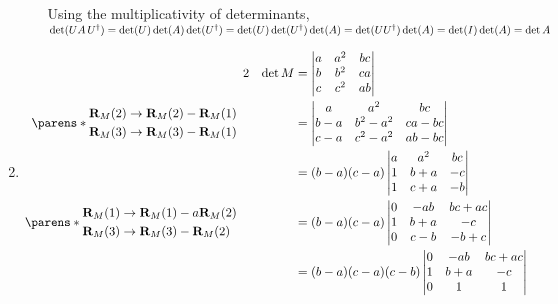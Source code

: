 \documentclass[fleqn,a4paper,11pt]{article}
\begin{document}
\begin{enumerate}[label=\textbf{\arabic*.}]
\begin{enumerate}[label=(\roman*)]
      Using the multiplicativity of determinants,
      \(\det(UA\,U^\dag) = \det(U)\det(A)\det(U^\dag)
        = \det(U)\det(U^\dag)\det(A)
        = \det(UU^\dag)\det(A)
        = \det(I) \det(A)
        = \det A
        \)
   \end{enumerate}
  \item
   \begin{alignat*} 2
    && \det M
     &= \begin{vmatrix}
      a & a^2 & bc \\
      b & b^2 & ca \\
      c & c^2 & ab
     \end{vmatrix} \\
    \parens*{
     \begin{aligned}
      \vec R_M(2) &\to \vec R_M(2) - \vec R_M(1) \\
      \vec R_M(3) &\to \vec R_M(3) - \vec R_M(1)
     \end{aligned}} \quad
    && &= \begin{vmatrix}
      a & a^2 & bc \\
      b - a & b^2 - a^2 & ca - bc \\
      c - a & c^2 - a^2 & ab - bc
     \end{vmatrix} \\
    && &= (b - a)(c - a)\begin{vmatrix}
      a & a^2 & bc \\
      1 & b + a & -c \\
      1 & c + a & -b
     \end{vmatrix} \\
    \parens*{
     \begin{aligned}
      \vec R_M(1) &\to \vec R_M(1) - a\vec R_M(2) \\
      \vec R_M(3) &\to \vec R_M(3) - \vec R_M(2)
     \end{aligned}} \quad
    && &= (b - a)(c - a)\begin{vmatrix}
      0 & -ab & bc + ac \\
      1 & b + a & -c \\
      0 & c - b & -b + c
     \end{vmatrix} \\
    && &= (b - a)(c - a)(c - b)\begin{vmatrix}
      0 & -ab & bc + ac \\
      1 & b + a & -c \\
      0 & 1 & 1
     \end{vmatrix} \\

\end{alignat*}
\end{enumerate}
\end{document}
